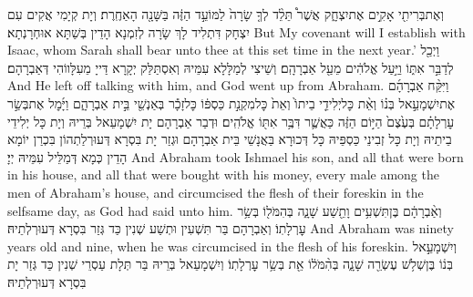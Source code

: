 {וְאֶת\maqqaf בְּרִיתִ֖י אָקִ֣ים אֶת\maqqaf יִצְחָ֑ק אֲשֶׁר֩ תֵּלֵ֨ד לְךָ֤ שָׂרָה֙ לַמּוֹעֵ֣ד הַזֶּ֔ה בַּשָּׁנָ֖ה הָאַחֶֽרֶת׃}
{וְיָת קְיָמִי אֲקִים עִם יִצְחָק דִּתְלִיד לָךְ שָׂרָה לְזִמְנָא הָדֵין בְּשַׁתָּא אוּחְרָנְתָא׃}
{But My covenant will I establish with Isaac, whom Sarah shall bear unto thee at this set time in the next year.’}{}
{וַיְכַ֖ל לְדַבֵּ֣ר אִתּ֑וֹ וַיַּ֣עַל אֱלֹהִ֔ים מֵעַ֖ל אַבְרָהָֽם׃}
{וְשֵׁיצִי לְמַלָּלָא עִמֵּיהּ וְאִסְתַּלַּק יְקָרָא דַּייָ מֵעִלָּווֹהִי דְּאַבְרָהָם׃}
{And He left off talking with him, and God went up from Abraham.}{}
{וַיִּקַּ֨ח אַבְרָהָ֜ם אֶת\maqqaf יִשְׁמָעֵ֣אל בְּנ֗וֹ וְאֵ֨ת כׇּל\maqqaf יְלִידֵ֤י בֵיתוֹ֙ וְאֵת֙ כׇּל\maqqaf מִקְנַ֣ת כַּסְפּ֔וֹ כׇּל\maqqaf זָכָ֕ר בְּאַנְשֵׁ֖י בֵּ֣ית אַבְרָהָ֑ם וַיָּ֜מׇל אֶת\maqqaf בְּשַׂ֣ר עׇרְלָתָ֗ם בְּעֶ֙צֶם֙ הַיּ֣וֹם הַזֶּ֔ה כַּאֲשֶׁ֛ר דִּבֶּ֥ר אִתּ֖וֹ אֱלֹהִֽים׃}
{וּדְבַר אַבְרָהָם יָת יִשְׁמָעֵאל בְּרֵיהּ וְיָת כָּל יְלִידֵי בֵיתֵיהּ וְיָת כָּל זְבִינֵי כַּסְפֵּיהּ כָּל דְּכוּרָא בַּאֲנָשֵׁי בֵּית אַבְרָהָם וּגְזַר יָת בִּסְרָא דְּעוּרְלַתְהוֹן בִּכְרַן יוֹמָא הָדֵין כְּמָא דְּמַלֵּיל עִמֵּיהּ יְיָ׃}
{And Abraham took Ishmael his son, and all that were born in his house, and all that were bought with his money, every male among the men of Abraham’s house, and circumcised the flesh of their foreskin in the selfsame day, as God had said unto him.}{}
{וְאַ֨בְרָהָ֔ם בֶּן\maqqaf תִּשְׁעִ֥ים וָתֵ֖שַׁע שָׁנָ֑ה בְּהִמֹּל֖וֹ בְּשַׂ֥ר עׇרְלָתֽוֹ׃}
{וְאַבְרָהָם בַּר תִּשְׁעִין וּתְשַׁע שְׁנִין כַּד גְּזַר בִּסְרָא דְּעוּרְלְתֵיהּ׃}
{And Abraham was ninety years old and nine, when he was circumcised in the flesh of his foreskin.}{}
{וְיִשְׁמָעֵ֣אל בְּנ֔וֹ בֶּן\maqqaf שְׁלֹ֥שׁ עֶשְׂרֵ֖ה שָׁנָ֑ה בְּהִ֨מֹּל֔וֹ אֵ֖ת בְּשַׂ֥ר עׇרְלָתֽוֹ׃}
{וְיִשְׁמָעֵאל בְּרֵיהּ בַּר תְּלָת עַסְרֵי שְׁנִין כַּד גְּזַר יָת בִּסְרָא דְּעוּרְלְתֵיהּ׃}
